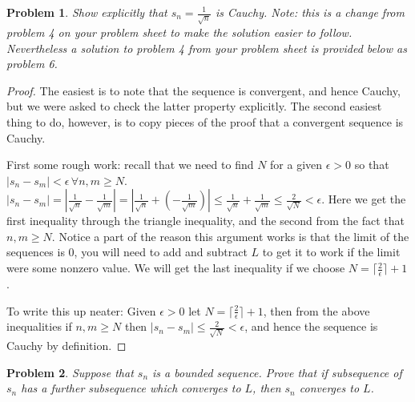 \documentclass[11pt]{article}
\theoremstyle{plain}
\newtheorem{problem}{Problem}
\theoremstyle{remark}
\begin{document}
	\begin{problem}
		Show explicitly that $s_n=\frac{1}{\sqrt{n}}$ is
                Cauchy. Note: this is a change from problem 4 on your
                problem sheet to make the solution easier to
                follow. Nevertheless a solution to problem 4 from your
                problem sheet is provided below as problem 6.
	\end{problem}

	\begin{proof}
		The easiest is to note that the sequence is convergent, and hence Cauchy, but we were asked to check the latter property explicitly. The second easiest thing to do, however, is to copy pieces of the proof that a convergent sequence is Cauchy.
		
		First some rough work: recall that we need to find $N$ for a given $\epsilon>0$ so that $|s_n-s_m|<\epsilon\,\forall n,m\geq N$. $|s_n-s_m|=\left|\frac {1}{\sqrt n}-\frac {1}{\sqrt m}\right|=\left|\frac {1}{\sqrt n}+\left(-\frac {1}{\sqrt m}\right)\right|\leq \frac{1}{\sqrt n}+\frac{1}{\sqrt m}\leq \frac{2}{\sqrt N}<\epsilon$. Here we get the first inequality through the triangle inequality, and the second from the fact that $n,m\geq N$. Notice a part of the reason this argument works is that the limit of the sequences is 0, you will need to add and subtract $L$ to get it to work if the limit were some nonzero value. We will get the last inequality if we choose $N=\lceil \frac {2}{\epsilon} \rceil + 1$.
		
		To write this up neater: Given $\epsilon>0$ let $N=\lceil \frac {2}{\epsilon} \rceil + 1$, then from the above inequalities if $n,m\geq N$ then $|s_n-s_m|\leq \frac{2}{\sqrt N}<\epsilon$, and hence the sequence is Cauchy by definition.
	\end{proof}

\begin{problem}
	Suppose that $s_n$ is a bounded sequence. Prove that if subsequence of $s_n$ has a further subsequence which converges to $L$, then $s_n$ converges to $L$. 
\end{problem}
\end{document}
